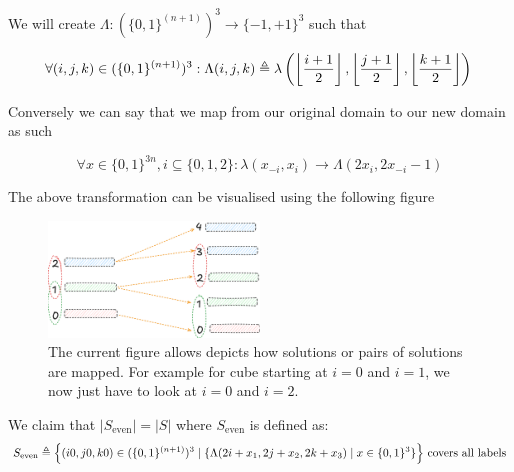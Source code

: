 We will create $\Lambda: (\{0,1\}^{(n+1)})^3 \to \{-1, +1\}^3$ such that
 
$$
    \forall (i,j,k) \in (\{0,1\}^{(n+1)})^3: \Lambda(i,j,k) \triangleq 
\lambda\left( \left\lfloor  \frac{{i+1}}{2}  \right\rfloor, \left\lfloor  \frac{{j+1}}{2} \right\rfloor, \left\lfloor  \frac{{k+1}}{2} \right\rfloor \right)  \\
$$

Conversely we can say that we map from our original domain to our new domain as such

$$
\forall  x \in \{ 0,1 \}^{3n}, i \subseteq \{ 0,1,2 \}: \lambda(x_{-i}, x_{i}) \to \Lambda(2x_{i}, 2x_{-i} -1)
$$

The above transformation can be visualised using the following figure

\begin{figure}[h!]
    \centering
    \includegraphics[width=0.5\textwidth]{assets/1751381227.png}
    \caption{The current figure allows depicts how solutions or pairs of solutions are mapped. For example for cube starting at 
        $i = 0$ and $i = 1$, we now just have to look at $i = 0$ and $i = 2$.}
    \label{fig:main-proof:set_mapping}
\end{figure}


\begin{claim}
    \label{clm:main-proof:trans-claim}
    We claim that $|S_{\text{even}}| = |S|$ where $S_{\text{even}}$  is defined as:
    $$
S_{\text{even}} \triangleq
   \Big\{(i0,j0,k0) \in (\{0,1\}^{(n+1)})^3 \mid  \\
   \{\Lambda(2i + x_1, 2j + x_2, 2k + x_3) \mid x \in \{0,1\}^3 \}\Big\} \text{ covers all labels}
    $$
\end{claim}

